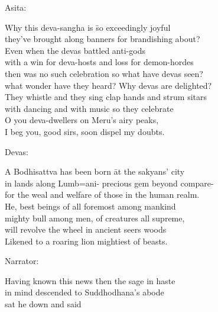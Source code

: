 \begin{MyDescription}[]{Asita:}
\end{MyDescription}   
\begin{tabbing}
Why this deva-sangha is \hspace{1.5cm} \= so exceedingly joyful\\
they've brought along banners \> for brandishing about?\\
Even when the devas \> battled anti-gods\\
with a win for deva-hosts \> and loss for demon-hordes\\
then was no such celebration \> so what have devas seen?\\
what wonder have they heard? \> Why devas are delighted?\\
They whistle and they sing \> clap hands and strum sitars\\
with dancing and with music \> so they celebrate\\
O you deva-dwellers \> on Meru's airy peaks,\\
I beg you, good sirs, \> soon dispel my doubts.
\end{tabbing}

\begin{MyDescription}[]{Devas:}
\end{MyDescription}   
\begin{tabbing}
A Bodhisattva has been born \= at the sakyans' city\\
in lands along Lumb\a=ani- \> precious gem beyond compare-\\
for the weal and welfare \> of those in the human realm.\\
He, best beings of all \> foremost among mankind\\
mighty bull among men, \> of creatures all supreme,\\
will revolve the wheel \> in ancient seers woods\\
Likened to a roaring lion \> mightiest of beasts.\\
\end{tabbing}
\begin{MyDescription}[]{Narrator:}
\end{MyDescription}   
\begin{tabbing}
Having known this news \= then the sage in haste\\
in mind descended to \> Suddhodhana's abode\\
sat he down and said\\
\end{tabbing}

